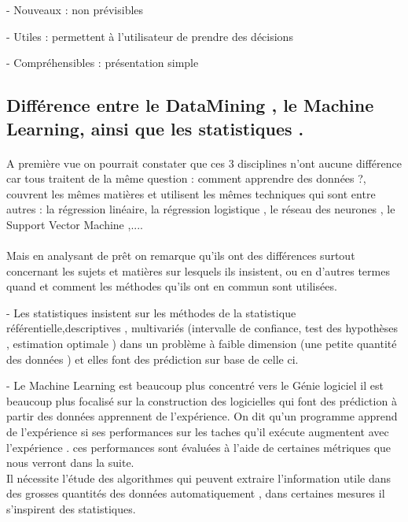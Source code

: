 - 	Nouveaux : non prévisibles 

-	Utiles :       permettent à l'utilisateur de prendre des décisions

-	Compréhensibles : présentation simple

\subsection{  Différence entre le DataMining , le Machine Learning, ainsi que les statistiques . {\cite{differenceMLDM2} \cite{differenceMLDM} \cite{differenceMLDMStack}}} 
\paragraph{}
A première vue on pourrait constater que ces 3 disciplines n'ont aucune différence car tous traitent de la même question : comment apprendre des données ?, couvrent les mêmes matières et utilisent les mêmes techniques qui sont entre autres : la régression linéaire, la régression logistique  , le réseau des neurones , le Support Vector Machine ,....
\paragraph{} 
Mais en analysant de prêt on remarque qu'ils ont des différences surtout concernant les sujets et matières sur lesquels ils insistent, ou en d'autres termes quand et comment les méthodes qu'ils ont en commun sont utilisées.

- Les statistiques insistent sur les méthodes de la  statistique référentielle,descriptives , multivariés  (intervalle de confiance, test des hypothèses , estimation optimale )  dans un problème à faible dimension (une petite quantité des données ) et elles font des prédiction sur base de celle ci.\cite{differenceMLDM}

- Le Machine Learning est beaucoup plus concentré vers le Génie logiciel il est beaucoup plus focalisé sur la construction des logicielles qui font des prédiction à partir des données apprennent de l'expérience. On dit qu'un programme apprend de l'expérience si ses performances sur les taches qu'il exécute augmentent avec l'expérience . ces performances sont évaluées à l'aide de certaines métriques que nous verront dans la suite.\\
Il nécessite l'étude des algorithmes qui peuvent extraire l'information utile dans des grosses quantités des données automatiquement , dans certaines mesures il s'inspirent des statistiques. \cite{differenceMLDMStack}   

